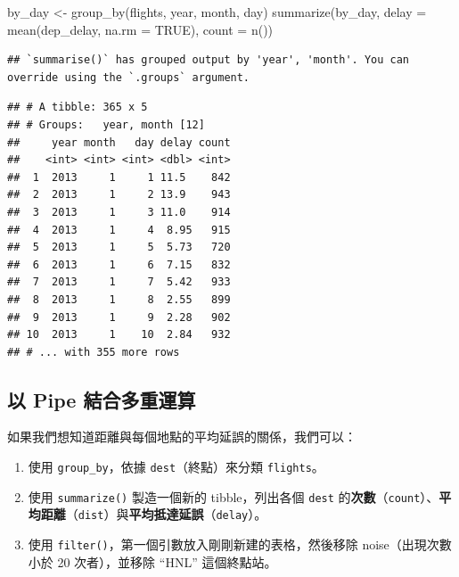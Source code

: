 \documentclass[
]{book}
\newenvironment{Shaded}{\begin{snugshade}}{\end{snugshade}}
\newcommand{\AttributeTok}[1]{\textcolor[rgb]{0.77,0.63,0.00}{#1}}
\newcommand{\ConstantTok}[1]{\textcolor[rgb]{0.00,0.00,0.00}{#1}}
\newcommand{\FunctionTok}[1]{\textcolor[rgb]{0.00,0.00,0.00}{#1}}
\newcommand{\NormalTok}[1]{#1}
\newcommand{\OtherTok}[1]{\textcolor[rgb]{0.56,0.35,0.01}{#1}}
\theoremstyle{definition}
\theoremstyle{remark}
\begin{document}
\begin{Shaded}
\begin{Highlighting}[]
\NormalTok{by\_day }\OtherTok{\textless{}{-}} \FunctionTok{group\_by}\NormalTok{(flights, year, month, day)}
\FunctionTok{summarize}\NormalTok{(by\_day, }\AttributeTok{delay =} \FunctionTok{mean}\NormalTok{(dep\_delay, }\AttributeTok{na.rm =} \ConstantTok{TRUE}\NormalTok{), }\AttributeTok{count =} \FunctionTok{n}\NormalTok{())}
\end{Highlighting}
\end{Shaded}

\begin{verbatim}
## `summarise()` has grouped output by 'year', 'month'. You can override using the `.groups` argument.
\end{verbatim}

\begin{verbatim}
## # A tibble: 365 x 5
## # Groups:   year, month [12]
##     year month   day delay count
##    <int> <int> <int> <dbl> <int>
##  1  2013     1     1 11.5    842
##  2  2013     1     2 13.9    943
##  3  2013     1     3 11.0    914
##  4  2013     1     4  8.95   915
##  5  2013     1     5  5.73   720
##  6  2013     1     6  7.15   832
##  7  2013     1     7  5.42   933
##  8  2013     1     8  2.55   899
##  9  2013     1     9  2.28   902
## 10  2013     1    10  2.84   932
## # ... with 355 more rows
\end{verbatim}

\hypertarget{ux4ee5-pipe-ux7d50ux5408ux591aux91cdux904bux7b97}{%
\subsection{以 Pipe 結合多重運算}\label{ux4ee5-pipe-ux7d50ux5408ux591aux91cdux904bux7b97}}

如果我們想知道距離與每個地點的平均延誤的關係，我們可以：

\begin{enumerate}
\def\labelenumi{\arabic{enumi}.}
\item
  使用 \texttt{group\_by}，依據 \texttt{dest}（終點）來分類 \texttt{flights}。
\item
  使用 \texttt{summarize()} 製造一個新的 tibble，列出各個 \texttt{dest} 的\textbf{次數}（\texttt{count}）、\textbf{平均距離}（\texttt{dist}）與\textbf{平均抵達延誤}（\texttt{delay}）。
\item
  使用 \texttt{filter()}，第一個引數放入剛剛新建的表格，然後移除 noise（出現次數小於 20 次者），並移除 ``HNL'' 這個終點站。
\end{enumerate}
\end{document}
